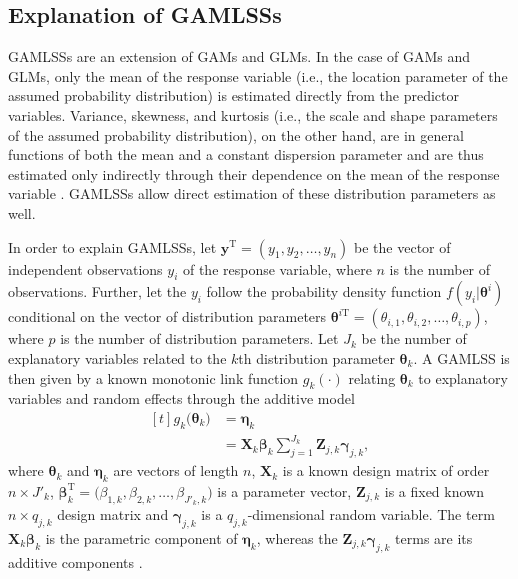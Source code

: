 \subsection{Explanation of GAMLSSs}

GAMLSSs \parencite{Rigby2001,Akanztiliotou2002,Rigby2005} are an extension of GAMs and GLMs.  In the case of GAMs and GLMs, only the mean of the response variable (i.e., the location parameter of the assumed probability distribution) is estimated directly from the predictor variables.  Variance, skewness, and kurtosis (i.e., the scale and shape parameters of the assumed probability distribution), on the other hand, are in general functions of both the mean and a constant dispersion parameter and are thus estimated only indirectly through their dependence on the mean of the response variable \parencite{Rigby2001}.  GAMLSSs allow direct estimation of these distribution parameters as well.

In order to explain GAMLSSs, let \(\symbf{y}^{\text{T}} = (y_1, y_2, \ldots, y_n)\) be the vector of independent observations \(y_i\) of the response variable, where \(n\) is the number of observations.  Further, let the \(y_i\) follow the probability density function \(f(y_i|\symbf{\theta}^i)\) conditional on the vector of distribution parameters \(\symbf{\theta}^{i \text{T}} = (\theta_{i, 1}, \theta_{i, 2}, \ldots, \theta_{i, p})\), where \(p\) is the number of distribution parameters. Let \(J_k\) be the number of explanatory variables related to the \(k\)th distribution parameter \(\symbf{\theta}_k\).  A GAMLSS is then given by a known monotonic link function \(g_k(\cdot)\) relating \(\symbf{\theta}_k\) to explanatory variables and random effects through the additive model 
\begin{equation}
  \label{eq:GAMLSSRigbyStasinopoulos2005}
  \begin{aligned}[t]
    g_k\bigl(\symbf{\theta}_k\bigr) &= \symbf{\eta}_k \\
    &= \symbf{X}_k \symbf{\beta}_k \sum_{j = 1}^{J_k} \symbf{Z}_{j, k} \symbf{\gamma}_{j, k},
\end{aligned}
\end{equation}
where \(\symbf{\theta}_k\) and \(\symbf{\eta}_k\) are vectors of length \(n\), \(\symbf{X}_k\) is a known design matrix of order \(n \times J'_k\), \(\symbf{\beta}_k^{\text{T}} = \bigl(\beta_{1, k}, \beta_{2, k}, \ldots, \beta_{J'_k, k}\bigr)\) is a parameter vector, \(\symbf{Z}_{j, k}\) is a fixed known \(n \times q_{j, k}\) design matrix and \(\symbf{\gamma}_{j, k}\) is a \(q_{j, k}\)-dimensional random variable.  The term \(\symbf{X}_k \symbf{\beta}_k\) is the parametric component of \(\symbf{\eta}_k\), whereas the \(\symbf{Z}_{j, k} \symbf{\gamma}_{j, k}\) terms are its additive components \parencite{Rigby2005}.

